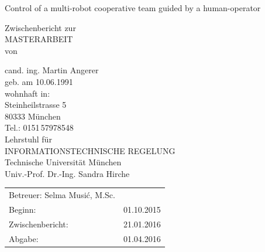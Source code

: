\documentclass[a4paper,twoside, openright,12pt]{report}
\begin{document}
\pagestyle{empty}
\enlargethispage{4.5cm} %
\begin{center}
\phantom{u}
\vspace{0.5cm}
\Huge{\sc Control of a multi-robot cooperative team guided by a human-operator}\\
\vspace{1.5cm}
                                 \large{%
                                 \large{Zwischenbericht zur\\
										MASTERARBEIT\\ 
										   von\\}          

						\vspace{0.4cm}
					cand. ing. Martin Angerer\\
						\vspace{0.5cm}
					geb. am 10.06.1991\\
					wohnhaft in:\\
					Steinheilstrasse 5\\
					80333 M\"unchen\\
					Tel.: 0151\,57978548\\
					\vspace{1.5cm}
					Lehrstuhl f\"ur\\
					INFORMATIONSTECHNISCHE REGELUNG \\
					Technische Universit\"at M\"unchen\\
					\vspace{0.6cm}
                    Univ.-Prof. Dr.-Ing. Sandra Hirche}
\end{center}
\vspace{5.0cm}
\begin{tabular}{ll}
Betreuer: Selma Musi\'c, M.Sc.  \\
Beginn: & 01.10.2015  \\
Zwischenbericht: &  21.01.2016  \\
Abgabe: &  01.04.2016 \\
\end{tabular}

\newpage
\cleardoublepage
\end{document}
